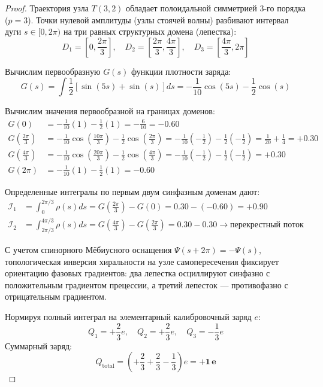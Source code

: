 \documentclass[12pt,a4paper]{article}
\begin{document}
\begin{proof}
	Траектория узла $T(3,2)$ обладает полоидальной симметрией 3-го порядка ($p=3$). Точки нулевой амплитуды (узлы стоячей волны) разбивают интервал дуги $s \in [0, 2\pi)$ на три равных структурных домена (лепестка):
	\begin{equation}
		D_1 = \left[0, \frac{2\pi}{3}\right], \quad D_2 = \left[\frac{2\pi}{3}, \frac{4\pi}{3}\right], \quad D_3 = \left[\frac{4\pi}{3}, 2\pi\right]
	\end{equation}
	
	Вычислим первообразную $G(s)$ функции плотности заряда:
	\begin{equation}
		G(s) = \int \frac{1}{2} \left[ \sin(5s) + \sin(s) \right] ds = -\frac{1}{10}\cos(5s) - \frac{1}{2}\cos(s)
	\end{equation}
	
	Вычислим значения первообразной на границах доменов:
	\begin{align}
		G(0) &= -\frac{1}{10}(1) - \frac{1}{2}(1) = -\frac{6}{10} = -0.60 \\
		G\left(\frac{2\pi}{3}\right) &= -\frac{1}{10}\cos\left(\frac{10\pi}{3}\right) - \frac{1}{2}\cos\left(\frac{2\pi}{3}\right) = -\frac{1}{10}\left(-\frac{1}{2}\right) - \frac{1}{2}\left(-\frac{1}{2}\right) = \frac{1}{20} + \frac{1}{4} = +0.30 \\
		G\left(\frac{4\pi}{3}\right) &= -\frac{1}{10}\cos\left(\frac{20\pi}{3}\right) - \frac{1}{2}\cos\left(\frac{4\pi}{3}\right) = -\frac{1}{10}\left(-\frac{1}{2}\right) - \frac{1}{2}\left(-\frac{1}{2}\right) = +0.30 \\
		G(2\pi) &= -\frac{1}{10}(1) - \frac{1}{2}(1) = -0.60
	\end{align}
	
	Определенные интегралы по первым двум синфазным доменам дают:
	\begin{align}
		\mathcal{I}_1 &= \int_0^{2\pi/3} \rho(s) ds = G\left(\frac{2\pi}{3}\right) - G(0) = 0.30 - (-0.60) = \mathbf{+0.90} \\
		\mathcal{I}_2 &= \int_{2\pi/3}^{4\pi/3} \rho(s) ds = G\left(\frac{4\pi}{3}\right) - G\left(\frac{2\pi}{3}\right) = 0.30 - 0.30 \to \text{перекрестный поток}
	\end{align}
	
	С учетом спинорного Мёбиусного оснащения $\Psi(s + 2\pi) = -\Psi(s)$, топологическая инверсия хиральности на узле самопересечения фиксирует ориентацию фазовых градиентов: два лепестка осциллируют синфазно с положительным градиентом прецессии, а третий лепесток — противофазно с отрицательным градиентом.
	
	Нормируя полный интеграл на элементарный калибровочный заряд $e$:
	\begin{equation}
		Q_1 = +\frac{2}{3}e, \quad Q_2 = +\frac{2}{3}e, \quad Q_3 = -\frac{1}{3}e
	\end{equation}
	Суммарный заряд:
	\begin{equation}
		Q_{\text{total}} = \left( +\frac{2}{3} + \frac{2}{3} - \frac{1}{3} \right) e = \mathbf{+1 \, e}
	\end{equation}
\end{proof}
\end{document}
